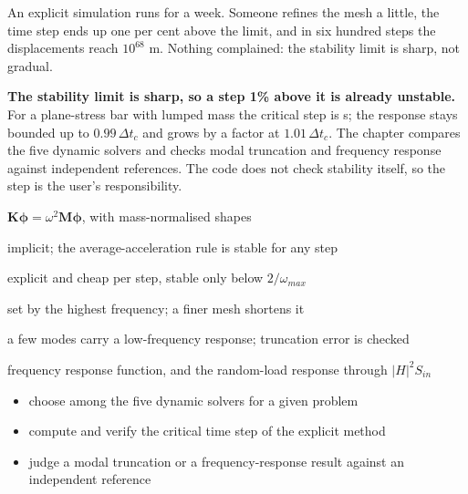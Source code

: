 \newpage\thispagestyle{hl}
\begin{hlquote}An explicit simulation runs for a week. Someone refines the mesh a little, the time step ends up one per cent above the limit, and in six hundred steps the displacements reach $10^{68}$ m. Nothing complained: the stability limit is sharp, not gradual.\end{hlquote}
\vspace{8pt}\begin{hlsum}\textbf{The stability limit is sharp, so a step 1\% above it is already unstable.} For a plane-stress bar with lumped mass the critical step is \cdyDtcLumped{} s; the response stays bounded up to $0.99\,\Delta t_c$ and grows by a factor \cdyGrowJustOver{} at $1.01\,\Delta t_c$. The chapter compares the five dynamic solvers and checks modal truncation and frequency response against independent references. The code does not check stability itself, so the step is the user's responsibility.\end{hlsum}
\begin{description}\setlength\itemsep{5pt}\setlength\parsep{0pt}\renewcommand{\descriptionlabel}[1]{\hspace{\labelsep}\sffamily\bfseries\color{hlnavy}#1}
\item[Natural frequencies and modes] $\bm K\bm\phi=\omega^2\bm M\bm\phi$, with mass-normalised shapes
\item[Newmark integration] implicit; the average-acceleration rule is stable for any step
\item[Central differences] explicit and cheap per step, stable only below $2/\omega_{max}$
\item[Critical time step] set by the highest frequency; a finer mesh shortens it
\item[Modal superposition] a few modes carry a low-frequency response; truncation error is checked
\item[FRF and PSD] frequency response function, and the random-load response through $|H|^2S_{in}$
\end{description}
\begin{itemize}\setlength\itemsep{3pt}
\item choose among the five dynamic solvers for a given problem
\item compute and verify the critical time step of the explicit method
\item judge a modal truncation or a frequency-response result against an independent reference
\end{itemize}
